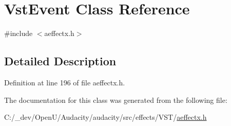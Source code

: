 \hypertarget{class_vst_event}{}\section{Vst\+Event Class Reference}
\label{class_vst_event}


{\ttfamily \#include $<$aeffectx.\+h$>$}



\subsection{Detailed Description}


Definition at line 196 of file aeffectx.\+h.



The documentation for this class was generated from the following file\+:\begin{DoxyCompactItemize}
\item 
C\+:/\+\_\+dev/\+Open\+U/\+Audacity/audacity/src/effects/\+V\+S\+T/\hyperlink{aeffectx_8h}{aeffectx.\+h}\end{DoxyCompactItemize}
